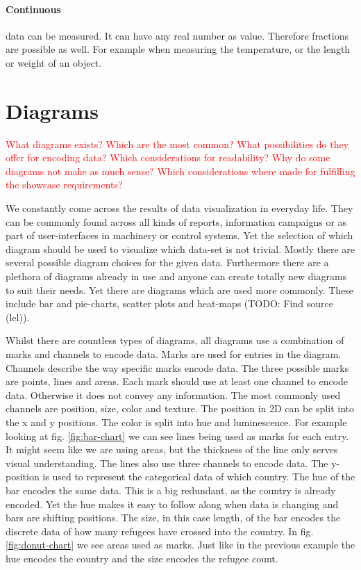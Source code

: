 \paragraph{Continuous}
data can be measured. It can have any real number as value. Therefore fractions are possible as well. For example when measuring the temperature, or the length or weight of an object.


\section{Diagrams}
\textcolor{red}{
What diagrams exists? Which are the most common? What possibilities do they offer for encoding data? Which considerations for readability? Why do some diagrams not make as much sense? Which considerations where made for fulfilling the showcase requirements?}

We constantly come across the results of data visualization in everyday life. They can be commonly found across all kinds of reports, information campaigns or as part of user-interfaces in machinery or control systems. Yet the selection of which diagram should be used to visualize which data-set is not trivial. Mostly there are several possible diagram choices for the given data. Furthermore there are a plethora of diagrams already in use and anyone can create totally new diagrams to suit their needs. Yet there are diagrams which are used more commonly. These include bar and pie-charts, scatter plots and heat-maps (TODO: Find source (lel)).

Whilst there are countless types of diagrams, all diagrams use a combination of marks and channels to encode data. Marks are used for entries in the diagram. Channels describe the way specific marks encode data. The three possible marks are points, lines and areas. Each mark should use at least one channel to encode data. Otherwise it does not convey any information. The most commonly used channels are position, size, color and texture. The position in 2D can be split into the x and y positions. The color is split into hue and luminescence. For example looking at fig. \ref{fig:bar-chart} we can see lines being used as marks for each entry. It might seem like we are using areas, but the thickness of the line only serves visual understanding. The lines also use three channels to encode data. The y-position is used to represent the categorical data of which country. The hue of the bar encodes the same data. This is a big redundant, as the country is already encoded. Yet the hue makes it easy to follow along when data is changing and bars are shifting positions. The size, in this case length, of the bar encodes the discrete data of how many refugees have crossed into the country. In fig. \ref{fig:donut-chart} we see areas used as marks. Just like in the previous example the hue encodes the country and the size encodes the refugee count. 

